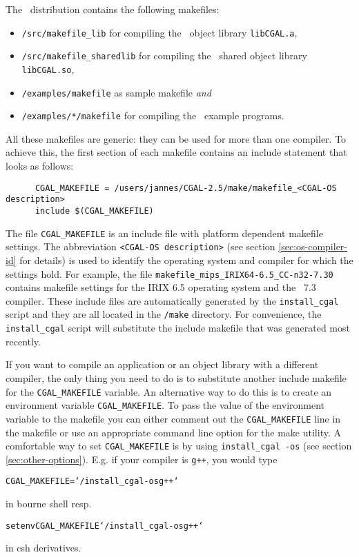 The \cgal\ distribution contains the following makefiles:
\begin{itemize}
\item \texttt{\cgaldir/src/makefile\_lib} for compiling the \cgal\ 
  object library \texttt{libCGAL.a},
  
\item \texttt{\cgaldir/src/makefile\_sharedlib} for compiling the
  \cgal\ shared object library \texttt{libCGAL.so},
  
\item \texttt{\cgaldir/examples/makefile} as sample makefile
  \textit{and}
  
\item \texttt{\cgaldir/examples/*/makefile} for compiling the \cgal\ 
  example programs.
\end{itemize}

All these makefiles are generic: they can be used for more than one
compiler.  To achieve this, the first section of each makefile
contains an include statement that looks as follows:

\begin{verbatim}
      CGAL_MAKEFILE = /users/jannes/CGAL-2.5/make/makefile_<CGAL-OS description>
      include $(CGAL_MAKEFILE)
\end{verbatim}

The file \texttt{CGAL\_MAKEFILE} is an include
file with platform dependent makefile
settings. The abbreviation \texttt{<CGAL-OS description>} (see section
\ref{sec:os-compiler-id} for details) is used to identify the
operating system and compiler for which the settings hold. For
example, the file \texttt{makefile\_mips\_IRIX64-6.5\_CC-n32-7.30}
contains makefile settings for the IRIX 6.5 operating system and the
\mipsprocc\ 7.3 compiler.  These include files are automatically
generated by the \texttt{install\_cgal} script and they are all
located in the \texttt{\cgaldir/make} directory.  For convenience, the
\texttt{install\_cgal} script will substitute the include makefile
that was generated most recently.

If you want to compile an application or an object library with a
different compiler, the only thing you need to do is to substitute
another include makefile for the \texttt{CGAL\_MAKEFILE} variable. An
alternative way to do this is to create an environment variable
\texttt{CGAL\_MAKEFILE}. To pass the value of the environment variable
to the makefile you can either comment out the \texttt{CGAL\_MAKEFILE}
line in the makefile or use an appropriate command line option for the
make utility.  A comfortable way to set \texttt{CGAL\_MAKEFILE} is by
using \texttt{install\_cgal~-os} (see section
\ref{sec:other-options}).  E.g. if your compiler is \texttt{g++}, you
would type
\begin{alltt}
CGAL_MAKEFILE=`\yourcgaldir/install_cgal -os g++`
\end{alltt}
in bourne shell resp.
\begin{alltt}
setenv CGAL_MAKEFILE `\yourcgaldir/install_cgal -os g++`
\end{alltt}
in csh derivatives. 

